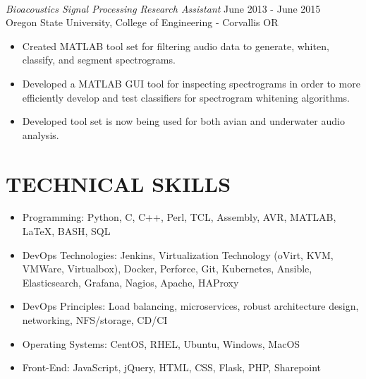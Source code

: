 \documentclass[line,margin]{res}
\begin{document}
\begin{resume}
\begin{adjustwidth}{-115pt}{0pt}
	\hfill\\
	{\sl Bioacoustics Signal Processing Research Assistant}
		\hfill June 2013 - June 2015\\
		Oregon State University, College of Engineering - Corvallis OR
		\begin{itemize}
			\item Created MATLAB tool set for filtering audio data to generate, whiten, classify, and segment spectrograms.
			\item Developed a MATLAB GUI tool for inspecting spectrograms in order to more efficiently develop and test classifiers for spectrogram whitening algorithms.
			\item Developed tool set is now being used for both avian and underwater audio analysis.
		\end{itemize}

\end{adjustwidth}

\section{TECHNICAL SKILLS}
\vspace{25px}
\begin{adjustwidth}{-115pt}{0pt}
	\begin{itemize}
		\item Programming: Python, C, C++, Perl, TCL, Assembly, AVR, MATLAB, \LaTeX, BASH, SQL
		\item DevOps Technologies: Jenkins, Virtualization Technology (oVirt, KVM, VMWare, Virtualbox), Docker, Perforce, Git, Kubernetes, Ansible, Elasticsearch, Grafana, Nagios, Apache, HAProxy
		\item DevOps Principles: Load balancing, microservices, robust architecture design, networking, NFS/storage, CD/CI
		\item Operating Systems: CentOS, RHEL, Ubuntu, Windows, MacOS
		\item Front-End: JavaScript, jQuery, HTML, CSS, Flask, PHP, Sharepoint
	\end{itemize}
\end{adjustwidth}


\end{resume}
\end{document}

